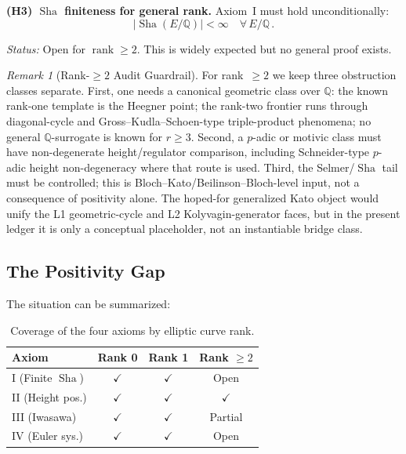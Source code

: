 \documentclass[aps,prd,twocolumn,superscriptaddress,nofootinbib,floatfix]{revtex4-2}
\theoremstyle{definition}
\theoremstyle{remark}
\newtheorem{remark}[theorem]{Remark}
\DeclareMathOperator{\rank}{rank}
\DeclareMathOperator{\Sha}{Sha}
\begin{document}
\textbf{(H3) $\Sha$ finiteness for general rank.} Axiom~I must hold unconditionally:
\begin{equation}
|\Sha(E/\mathbb{Q})| < \infty \quad \forall\, E/\mathbb{Q}\,.
\end{equation}

\textit{Status:} Open for $\rank \geq 2$. This is widely expected but no general proof exists.

\begin{remark}[Rank-$\geq 2$ Audit Guardrail]
\label{rem:rank-ge2-audit-guardrail}
For rank~$\geq2$ we keep three obstruction classes separate. First, one needs a canonical geometric class over $\mathbb{Q}$: the known rank-one template is the Heegner point; the rank-two frontier runs through diagonal-cycle and Gross--Kudla--Schoen-type triple-product phenomena; no general $\mathbb{Q}$-surrogate is known for $r\geq3$. Second, a $p$-adic or motivic class must have non-degenerate height/regulator comparison, including Schneider-type $p$-adic height non-degeneracy where that route is used. Third, the Selmer/$\Sha$ tail must be controlled; this is Bloch--Kato/Beilinson--Bloch-level input, not a consequence of positivity alone. The hoped-for generalized Kato object would unify the L1 geometric-cycle and L2 Kolyvagin-generator faces, but in the present ledger it is only a conceptual placeholder, not an instantiable bridge class.
\end{remark}

\subsection{The Positivity Gap}

The situation can be summarized:

\begin{table}[htbp]
\centering
\caption{Coverage of the four axioms by elliptic curve rank.}
\label{tab:axiom_coverage}
\begin{tabular*}{\columnwidth}{@{\extracolsep{\fill}}lccc@{}}
\toprule
\textbf{Axiom} & \textbf{Rank 0} & \textbf{Rank 1} & \textbf{Rank $\geq 2$} \\
\midrule
I (Finite $\Sha$) & $\checkmark$ & $\checkmark$ & Open \\
\addlinespace
II (Height pos.) & $\checkmark$ & $\checkmark$ & $\checkmark$ \\
\addlinespace
III (Iwasawa) & $\checkmark$ & $\checkmark$ & Partial \\
\addlinespace
IV (Euler sys.) & $\checkmark$ & $\checkmark$ & Open \\
\bottomrule
\end{tabular*}
\end{table}
\end{document}
